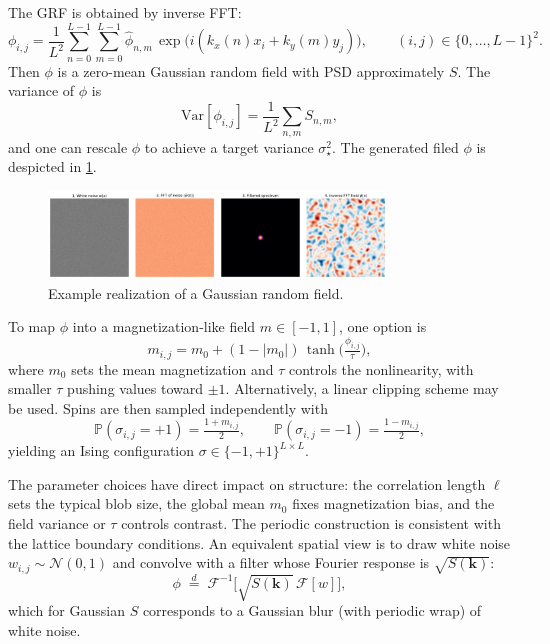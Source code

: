 \documentclass[11pt,a4paper]{article}
\begin{document}
The GRF is obtained by inverse FFT:
\begin{equation}
\phi_{i,j}=\frac{1}{L^2}\sum_{n=0}^{L-1}\sum_{m=0}^{L-1}\widehat{\phi}_{n,m}\,\exp\!\Big(i(k_x(n)x_i+k_y(m)y_j)\Big),
\qquad (i,j)\in\{0,\dots,L-1\}^2.
\end{equation}
Then $\phi$ is a zero-mean Gaussian random field with PSD approximately $S$. The variance of $\phi$ is
\begin{equation}
\mathrm{Var}[\phi_{i,j}]=\frac{1}{L^2}\sum_{n,m} S_{n,m},
\end{equation}
and one can rescale $\phi$ to achieve a target variance $\sigma_\star^2$. The generated filed $\phi$ is despicted in \cref{fig:grf}.
\begin{figure}
    \centering
    \includegraphics[width=0.8\textwidth]{fig/Gaussian_Random_Field.jpg}
    \caption{Example realization of a Gaussian random field.}
    \label{fig:grf}
\end{figure}

To map $\phi$ into a magnetization-like field $m\in[-1,1]$, one option is
\begin{equation}
m_{i,j}=m_0+(1-|m_0|)\,\tanh\!\Big(\tfrac{\phi_{i,j}}{\tau}\Big),
\end{equation}
where $m_0$ sets the mean magnetization and $\tau$ controls the nonlinearity, with smaller $\tau$ pushing values toward $\pm 1$. Alternatively, a linear clipping scheme may be used. Spins are then sampled independently with
\begin{equation}
\mathbb{P}(\sigma_{i,j}=+1)=\tfrac{1+m_{i,j}}{2},\qquad
\mathbb{P}(\sigma_{i,j}=-1)=\tfrac{1-m_{i,j}}{2},
\end{equation}
yielding an Ising configuration $\sigma\in\{-1,+1\}^{L\times L}$.

The parameter choices have direct impact on structure: the correlation length $\ell$ sets the typical blob size, the global mean $m_0$ fixes magnetization bias, and the field variance or $\tau$ controls contrast. The periodic construction is consistent with the lattice boundary conditions. An equivalent spatial view is to draw white noise $w_{i,j}\sim\mathcal{N}(0,1)$ and convolve with a filter whose Fourier response is $\sqrt{S(\mathbf{k})}$:
\begin{equation}
    \phi \;\stackrel{d}{=}\; \mathcal{F}^{-1}\!\Big[\sqrt{S(\mathbf{k})}\,\mathcal{F}[w]\Big],
\end{equation}
which for Gaussian $S$ corresponds to a Gaussian blur (with periodic wrap) of white noise.
\end{document}
